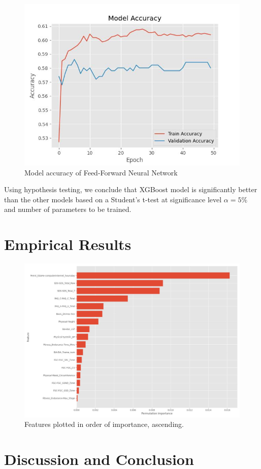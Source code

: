 \documentclass[12pt]{extarticle}
\begin{document}
    \begin{figure}[h!]
        \centering
        \includegraphics[scale=0.8]{"./images/model_accuracy.jpg"}
        \caption{Model accuracy of Feed-Forward Neural Network}
    \end{figure}

    Using hypothesis testing, we conclude that XGBoost model is significantly better than the other models based on a Student's t-test at significance level $\alpha=5\%$ and number of parameters to be trained.

\section{Empirical Results}

\begin{figure}[h!]
  \centering
  \includegraphics[scale=0.4]{"./images/feature_importance.jpg"}
  \caption{Features plotted in order of importance, ascending.}
\end{figure}


\section{Discussion and Conclusion}

\pagebreak
\nocite{*}



\pagebreak


\end{document}
